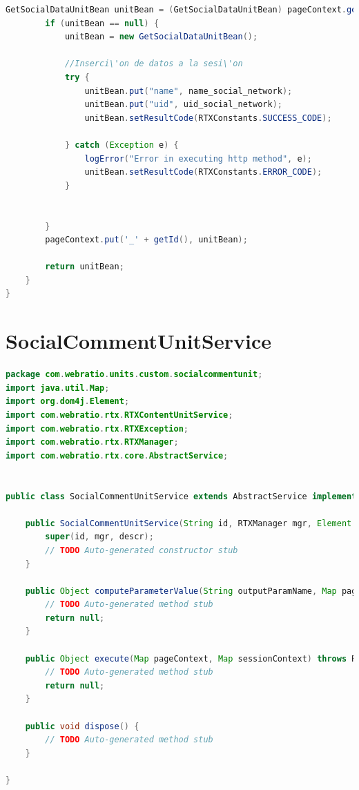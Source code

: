 \documentclass[oneside,12pt,a4paper]{memoir}%
\begin{document}
\begin{landscape}
\begin{lstlisting}[language=java, style=eclipse]
		GetSocialDataUnitBean unitBean = (GetSocialDataUnitBean) pageContext.get('_' + getId());
		if (unitBean == null) {
			unitBean = new GetSocialDataUnitBean();

			//Inserci\'on de datos a la sesi\'on
			try {
				unitBean.put("name", name_social_network);
				unitBean.put("uid", uid_social_network);
				unitBean.setResultCode(RTXConstants.SUCCESS_CODE);

			} catch (Exception e) {
				logError("Error in executing http method", e);
				unitBean.setResultCode(RTXConstants.ERROR_CODE);
			}


		}
		pageContext.put('_' + getId(), unitBean);

		return unitBean;
	}
}

\end{lstlisting}
\end{landscape}


\section{SocialCommentUnitService}
\begin{landscape}
\begin{lstlisting}[language=java, style=eclipse] 
package com.webratio.units.custom.socialcommentunit;
import java.util.Map;
import org.dom4j.Element;
import com.webratio.rtx.RTXContentUnitService;
import com.webratio.rtx.RTXException;
import com.webratio.rtx.RTXManager;
import com.webratio.rtx.core.AbstractService;


public class SocialCommentUnitService extends AbstractService implements RTXContentUnitService{

    public SocialCommentUnitService(String id, RTXManager mgr, Element descr) throws RTXException {
        super(id, mgr, descr);
        // TODO Auto-generated constructor stub
    }

    public Object computeParameterValue(String outputParamName, Map pageContext, Map sessionContext) throws RTXException {
        // TODO Auto-generated method stub
        return null;
    }

    public Object execute(Map pageContext, Map sessionContext) throws RTXException {
        // TODO Auto-generated method stub
        return null;
    }

    public void dispose() {
        // TODO Auto-generated method stub
    }

}
\end{lstlisting}
\end{landscape}
\end{document}
